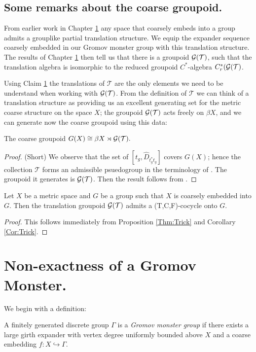 \subsection{Some remarks about the coarse groupoid.}

From earlier work in Chapter \ref{} any space that coarsely embeds into a group admits a grouplike partial translation structure. We equip the expander sequence coarsely embedded in our Gromov monster group with this translation structure. The results of Chapter \ref{} then tell us that there is a groupoid $\mathcal{G}(\mathcal{T})$, such that the translation algebra is isomorphic to the reduced groupoid  $C^{*}$-algebra $C^{*}_{r}(\mathcal{G}(\mathcal{T})$. 

Using Claim \ref{} the translations of $\mathcal{T}$ are the only elements we need to be understand when working with $\mathcal{G}(\mathcal{T})$. From the definition of $\mathcal{T}$ we can think of a translation structure as providing us an excellent generating set for the metric coarse structure on the space $X$; the groupoid $\mathcal{G}(\mathcal{T})$ acts freely on $\beta X$, and we can generate now the coarse groupoid using this data:

\begin{lemma}\label{Lem:CG}
The coarse groupoid $G(X) \cong \beta X \rtimes \mathcal{G}(\mathcal{T}).$
\end{lemma}
\begin{proof}(Short)
We observe that the set of $[t_{g},\widehat{D}_{t_{g}^{*}t_{g}}]$ covers $G(X)$; hence the collection $\mathcal{T}$ forms an admissible psuedogroup in the terminology of \cite{MR1905840}. The groupoid it generates is $\mathcal{G}(\mathcal{T})$. Then the result follows from \cite[Lemma 3.3b)]{MR1905840}.
\end{proof}


\begin{proposition}\label{Prop:Cocycle}
Let $X$ be a metric space and $G$ be a group such that $X$ is coarsely embedded into $G$. Then the translation groupoid $\mathcal{G}(\mathcal{T})$ admits a (T,C,F)-cocycle onto $G$.
\end{proposition}
\begin{proof}
This follows immediately from Proposition \ref{Thm:Trick} and Corollary \ref{Cor:Trick}.
\end{proof}

\section{Non-exactness of a Gromov Monster.}
We begin with a definition:
\begin{definition}
A finitely generated discrete group $\Gamma$ is a \textit{Gromov monster group} if there exists a large girth expander with vertex degree uniformly bounded above $X$ and a coarse embedding $f: X \hookrightarrow \Gamma$. 
\end{definition}

